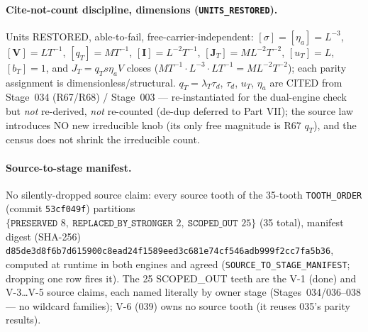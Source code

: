 \paragraph{Cite-not-count discipline, dimensions (\texttt{UNITS\_RESTORED}).}
Units RESTORED, able-to-fail, free-carrier-independent:
\([\sigma]=[\eta_a]=L^{-3}\), \([\mathbf V]=LT^{-1}\), \([q_T]=MT^{-1}\),
\([\mathbf I]=L^{-2}T^{-1}\), \([\mathbf J_T]=ML^{-2}T^{-2}\), \([u_T]=L\),
\([b_T]=1\), and \(J_T=q_T s\eta_a V\) closes
(\(MT^{-1}\cdot L^{-3}\cdot LT^{-1}=ML^{-2}T^{-2}\)); each parity assignment is
dimensionless/structural. \(q_T=\lambda_T\tau_d\), \(\tau_d\), \(u_T\), \(\eta_a\)
are CITED from Stage~034 (R67/R68) / Stage~003 --- re-instantiated for the
dual-engine check but \emph{not} re-derived, \emph{not} re-counted (de-dup deferred
to Part VII); the source law introduces NO new irreducible knob (its only free
magnitude is R67 \(q_T\)), and the census does not shrink the irreducible count.

\paragraph{Source-to-stage manifest.}
No silently-dropped source claim: every source tooth of the 35-tooth
\texttt{TOOTH\_ORDER} (commit \texttt{53cf049f}) partitions
\(\{\texttt{PRESERVED }8,\ \texttt{REPLACED\_BY\_STRONGER }2,\ \texttt{SCOPED\_OUT }25\}\)
(35 total), manifest digest (SHA-256)
\texttt{d85de3d8f6b7d615900c8ead24f1589eed3c681e74cf546adb999f2cc7fa5b36}, computed
at runtime in both engines and agreed (\texttt{SOURCE\_TO\_STAGE\_MANIFEST};
dropping one row fires it). The 25 SCOPED\_OUT teeth are the V-1 (done) and
V-3\dots V-5 source claims, each named literally by owner stage
(Stages~034/036--038 --- no wildcard families); V-6 (039) owns no source tooth
(it reuses 035's parity results).


